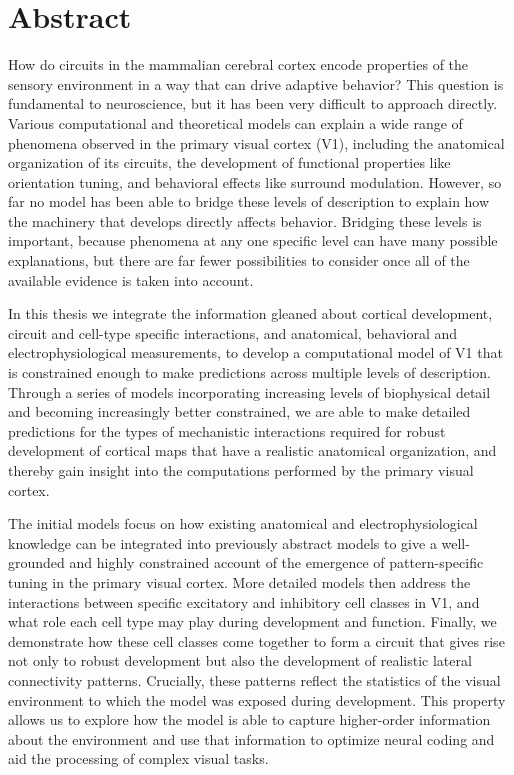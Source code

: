 
\begingroup
\let\clearpage\relax
\let\cleardoublepage\relax
\let\cleardoublepage\relax

\chapter*{Abstract} %
How do circuits in the mammalian cerebral cortex encode properties of
the sensory environment in a way that can drive adaptive behavior?
This question is fundamental to neuroscience, but it has been very
difficult to approach directly. Various computational and theoretical
models can explain a wide range of phenomena observed in the primary
visual cortex (V1), including the anatomical organization of its
circuits, the development of functional properties like orientation
tuning, and behavioral effects like surround modulation. However, so
far no model has been able to bridge these levels of description to
explain how the machinery that develops directly affects
behavior. Bridging these levels is important, because phenomena at any
one specific level can have many possible explanations, but there are
far fewer possibilities to consider once all of the available evidence
is taken into account.

In this thesis we integrate the information gleaned about cortical
development, circuit and cell-type specific interactions, and
anatomical, behavioral and electrophysiological measurements, to
develop a computational model of V1 that is constrained enough to make
predictions across multiple levels of description. Through a series of
models incorporating increasing levels of biophysical detail and
becoming increasingly better constrained, we are able to make detailed
predictions for the types of mechanistic interactions required for
robust development of cortical maps that have a realistic anatomical
organization, and thereby gain insight into the computations performed
by the primary visual cortex.

The initial models focus on how existing anatomical and
electrophysiological knowledge can be integrated into previously
abstract models to give a well-grounded and highly constrained account
of the emergence of pattern-specific tuning in the primary visual
cortex. More detailed models then address the interactions between
specific excitatory and inhibitory cell classes in V1, and what role
each cell type may play during development and function. Finally, we
demonstrate how these cell classes come together to form a circuit
that gives rise not only to robust development but also the
development of realistic lateral connectivity patterns.  Crucially,
these patterns reflect the statistics of the visual environment to
which the model was exposed during development. This property allows
us to explore how the model is able to capture higher-order
information about the environment and use that information to optimize
neural coding and aid the processing of complex visual tasks.

